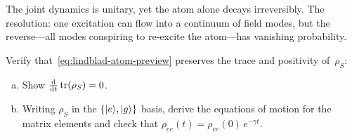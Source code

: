 \begin{intuition}
  The joint dynamics is unitary, yet the atom alone decays
  irreversibly.  The resolution: one excitation can flow into a
  continuum of field modes, but the reverse---all modes conspiring to
  re-excite the atom---has vanishing probability.
\end{intuition}

\begin{exercise}\label{ex:lindblad-form}
  Verify that~\eqref{eq:lindblad-atom-preview} preserves the trace
  and positivity of~$\rho_S$:
  \begin{enumerate}[(a)]
    \item Show $\frac{\mathrm{d}}{\mathrm{d} t}\operatorname{tr}(\rho_S)=0$.
    \item Writing $\rho_S$ in the $\{\lvert e \rangle,\lvert g \rangle\}$ basis, derive
      the equations of motion for the matrix elements and check that
      $\rho_{ee}(t)=\rho_{ee}(0)\,e^{-\gamma t}$.
  \end{enumerate}
\end{exercise}
